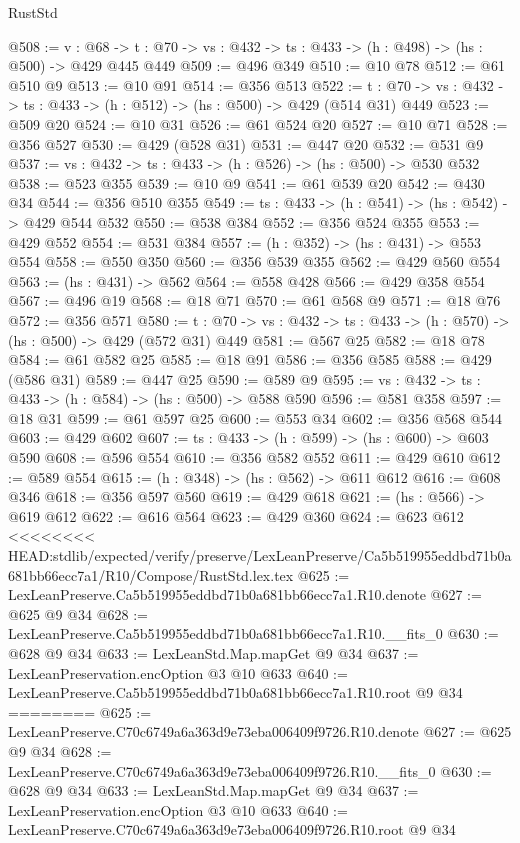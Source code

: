 \begin{lexlean}{RustStd}
\begin{coremodule}
{\begin{coremodule}
@508 := {v : @68} ->
  {t : @70} -> {vs : @432} -> {ts : @433} -> (h : @498) -> (hs : @500) -> @429 @445 @449
@509 := @496 @349
@510 := @10 @78
@512 := @61 @510 @9
@513 := @10 @91
@514 := @356 @513
@522 := {t : @70} -> {vs : @432} -> {ts : @433} -> (h : @512) -> (hs : @500) -> @429 (@514 @31) @449
@523 := @509 @20
@524 := @10 @31
@526 := @61 @524 @20
@527 := @10 @71
@528 := @356 @527
@530 := @429 (@528 @31)
@531 := @447 @20
@532 := @531 @9
@537 := {vs : @432} -> {ts : @433} -> (h : @526) -> (hs : @500) -> @530 @532
@538 := @523 @355
@539 := @10 @9
@541 := @61 @539 @20
@542 := @430 @34
@544 := @356 @510 @355
@549 := {ts : @433} -> (h : @541) -> (hs : @542) -> @429 @544 @532
@550 := @538 @384
@552 := @356 @524 @355
@553 := @429 @552
@554 := @531 @384
@557 := (h : @352) -> (hs : @431) -> @553 @554
@558 := @550 @350
@560 := @356 @539 @355
@562 := @429 @560 @554
@563 := (hs : @431) -> @562
@564 := @558 @428
@566 := @429 @358 @554
@567 := @496 @19
@568 := @18 @71
@570 := @61 @568 @9
@571 := @18 @76
@572 := @356 @571
@580 := {t : @70} -> {vs : @432} -> {ts : @433} -> (h : @570) -> (hs : @500) -> @429 (@572 @31) @449
@581 := @567 @25
@582 := @18 @78
@584 := @61 @582 @25
@585 := @18 @91
@586 := @356 @585
@588 := @429 (@586 @31)
@589 := @447 @25
@590 := @589 @9
@595 := {vs : @432} -> {ts : @433} -> (h : @584) -> (hs : @500) -> @588 @590
@596 := @581 @358
@597 := @18 @31
@599 := @61 @597 @25
@600 := @553 @34
@602 := @356 @568 @544
@603 := @429 @602
@607 := {ts : @433} -> (h : @599) -> (hs : @600) -> @603 @590
@608 := @596 @554
@610 := @356 @582 @552
@611 := @429 @610
@612 := @589 @554
@615 := (h : @348) -> (hs : @562) -> @611 @612
@616 := @608 @346
@618 := @356 @597 @560
@619 := @429 @618
@621 := (hs : @566) -> @619 @612
@622 := @616 @564
@623 := @429 @360
@624 := @623 @612
<<<<<<<< HEAD:stdlib/expected/verify/preserve/LexLeanPreserve/Ca5b519955eddbd71b0a681bb66ecc7a1/R10/Compose/RustStd.lex.tex
@625 := LexLeanPreserve.Ca5b519955eddbd71b0a681bb66ecc7a1.R10.denote
@627 := @625 @9 @34
@628 := LexLeanPreserve.Ca5b519955eddbd71b0a681bb66ecc7a1.R10.__fits_0
@630 := @628 @9 @34
@633 := LexLeanStd.Map.mapGet @9 @34
@637 := LexLeanPreservation.encOption @3 @10 @633
@640 := LexLeanPreserve.Ca5b519955eddbd71b0a681bb66ecc7a1.R10.root @9 @34
========
@625 := LexLeanPreserve.C70c6749a6a363d9e73eba006409f9726.R10.denote
@627 := @625 @9 @34
@628 := LexLeanPreserve.C70c6749a6a363d9e73eba006409f9726.R10.__fits_0
@630 := @628 @9 @34
@633 := LexLeanStd.Map.mapGet @9 @34
@637 := LexLeanPreservation.encOption @3 @10 @633
@640 := LexLeanPreserve.C70c6749a6a363d9e73eba006409f9726.R10.root @9 @34

\end{coremodule}}
\end{coremodule}
\end{lexlean}
